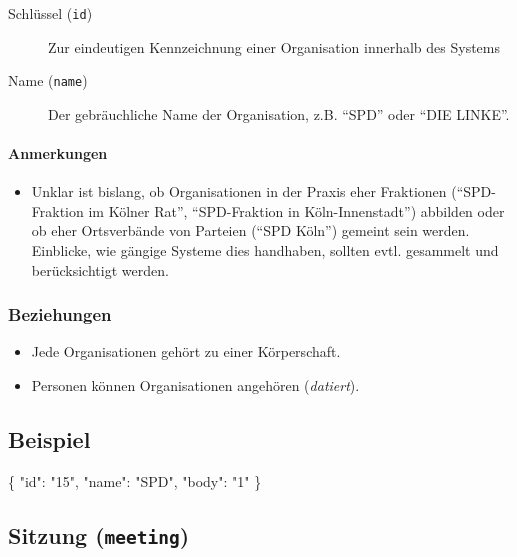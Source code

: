 \documentclass[,a4paper]{article}
\newenvironment{Shaded}{}{}
\newcommand{\DataTypeTok}[1]{\textcolor[rgb]{0.56,0.13,0.00}{{#1}}}
\newcommand{\StringTok}[1]{\textcolor[rgb]{0.25,0.44,0.63}{{#1}}}
\newcommand{\NormalTok}[1]{{#1}}
\begin{document}
\begin{description}
\item[Schlüssel (\texttt{id})]
Zur eindeutigen Kennzeichnung einer Organisation innerhalb des Systems
\item[Name (\texttt{name})]
Der gebräuchliche Name der Organisation, z.B. ``SPD'' oder ``DIE
LINKE''.
\end{description}

\paragraph{Anmerkungen}

\begin{itemize}
\item
  Unklar ist bislang, ob Organisationen in der Praxis eher Fraktionen
  (``SPD-Fraktion im Kölner Rat'', ``SPD-Fraktion in Köln-Innenstadt'')
  abbilden oder ob eher Ortsverbände von Parteien (``SPD Köln'') gemeint
  sein werden. Einblicke, wie gängige Systeme dies handhaben, sollten
  evtl. gesammelt und berücksichtigt werden.
\end{itemize}

\subsubsection{Beziehungen}

\begin{itemize}
\item
  Jede Organisationen gehört zu einer Körperschaft.
\item
  Personen können Organisationen angehören (\emph{datiert}).
\end{itemize}

\subsection{Beispiel}

\begin{Shaded}
\begin{Highlighting}[]
\NormalTok{\{}
    \DataTypeTok{"id"}\NormalTok{: }\StringTok{"15"}\NormalTok{,}
    \DataTypeTok{"name"}\NormalTok{: }\StringTok{"SPD"}\NormalTok{,}
    \DataTypeTok{"body"}\NormalTok{: }\StringTok{"1"}
\NormalTok{\}}
\end{Highlighting}
\end{Shaded}

\subsection{Sitzung (\texttt{meeting})}
\end{document}
